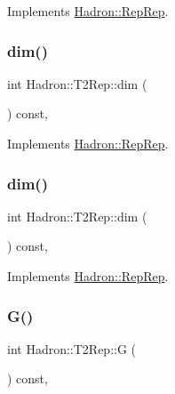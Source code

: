 Implements \mbox{\hyperlink{structHadron_1_1RepRep_a92c8802e5ed7afd7da43ccfd5b7cd92b}{Hadron\+::\+Rep\+Rep}}.

\mbox{\label{structHadron_1_1T2Rep_a06553069af895fb049a99d50612cba44}} 
\subsubsection{\texorpdfstring{dim()}{dim()}\hspace{0.1cm}{\footnotesize\ttfamily [2/3]}}
{\footnotesize\ttfamily int Hadron\+::\+T2\+Rep\+::dim (\begin{DoxyParamCaption}{ }\end{DoxyParamCaption}) const\hspace{0.3cm}{\ttfamily [inline]}, {\ttfamily [virtual]}}



Implements \mbox{\hyperlink{structHadron_1_1RepRep_a92c8802e5ed7afd7da43ccfd5b7cd92b}{Hadron\+::\+Rep\+Rep}}.

\mbox{\label{structHadron_1_1T2Rep_a06553069af895fb049a99d50612cba44}} 
\subsubsection{\texorpdfstring{dim()}{dim()}\hspace{0.1cm}{\footnotesize\ttfamily [3/3]}}
{\footnotesize\ttfamily int Hadron\+::\+T2\+Rep\+::dim (\begin{DoxyParamCaption}{ }\end{DoxyParamCaption}) const\hspace{0.3cm}{\ttfamily [inline]}, {\ttfamily [virtual]}}



Implements \mbox{\hyperlink{structHadron_1_1RepRep_a92c8802e5ed7afd7da43ccfd5b7cd92b}{Hadron\+::\+Rep\+Rep}}.

\mbox{\label{structHadron_1_1T2Rep_a909c7165132829f8e1b837f7afa00e61}} 
\subsubsection{\texorpdfstring{G()}{G()}\hspace{0.1cm}{\footnotesize\ttfamily [1/2]}}
{\footnotesize\ttfamily int Hadron\+::\+T2\+Rep\+::G (\begin{DoxyParamCaption}{ }\end{DoxyParamCaption}) const\hspace{0.3cm}{\ttfamily [inline]}, {\ttfamily [virtual]}}


